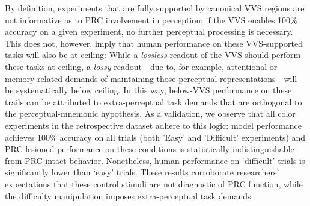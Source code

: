 \documentclass[11pt]{article}
\begin{document}
By definition, experiments that are fully supported by canonical VVS regions are not informative as to PRC involvement in perception; if the VVS enables 100\% accuracy on a given experiment, no further perceptual processing is necessary. This does not, however, imply that human performance on these VVS-supported tasks will also be at ceiling: While a \textit{lossless} readout of the VVS should perform these tasks at ceiling, a \textit{lossy} readout---due to, for example, attentional or memory-related demands of maintaining those perceptual representations---will be systematically below ceiling. In this way, below-VVS performance on these trails can be attributed to extra-perceptual task demands that are orthogonal to the perceptual-mnemonic hypothesis. As a validation, we observe that all color experiments in the retrospective dataset adhere to this logic: model performance achieves 100\% accuracy on all trials (both 'Easy' and 'Difficult' experiments) and PRC-lesioned performance on these conditions is statistically indistinguishable from PRC-intact behavior\cite{barense2007human}. Nonetheless, human performance on `difficult' trials is significantly lower than `easy' trials. These results corroborate researchers' expectations that these control stimuli are not diagnostic of PRC function, while the difficulty manipulation imposes extra-perceptual task demands. 
\end{document}
